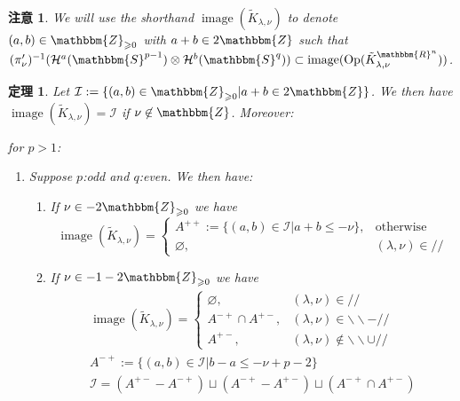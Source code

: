 \documentclass[12pt]{msjproc} %
\newcommand{\assign}{:=}
\newcommand{\nin}{\not\in}
\newcommand{\tmop}[1]{\ensuremath{\operatorname{#1}}}
\newtheorem{theorem}{定理}
\newtheorem{remark}{注意}
\begin{document}
\begin{versiona}
\begin{remark}
  We will use the shorthand $\tmop{image} (\tilde{K}_{\lambda, \nu})$ to
  denote $(a, b) \in \mathbbm{Z}_{\geqslant 0}$ with $a + b \in 2\mathbbm{Z}$
  such that $(\pi_{\nu}')^{- 1} (\mathcal{H}^a (\mathbbm{S}^{p - 1}) \otimes
  \mathcal{H}^b (\mathbbm{S}^q)) \subset \tmop{image} (\tmop{Op}
  (\tilde{K}_{\lambda, \nu}^{\mathbbm{R}^n}))$.
\end{remark}

\begin{theorem}
  \label{images:prop-main}Let $\mathcal{I} \assign \{ (a, b) \in
  \mathbbm{Z}_{\geqslant 0} | a + b \in 2\mathbbm{Z} \}$. We then have
  $\tmop{image} (\tilde{K}_{\lambda, \nu}) =\mathcal{I}$ if $\nu \nin
  \mathbbm{Z}$. Moreover:
  
  for $p > 1$:
\newcommand{\noplus}{}
  \begin{enumerate}
    \item Suppose $p$:odd and $q$:even. We then have:
    \begin{enumerate}
      \item If $\nu \in - 2\mathbbm{Z}_{\geqslant 0}$ we have
      \[ \tmop{image} (\tilde{K}_{\lambda, \nu}) = \left\{ \begin{array}{ll}
           A^{+ +} \assign \{ (a, b) \in \mathcal{I} | a + b \leqslant - \nu
           \}, & \tmop{otherwise}\\
           \varnothing, & (\lambda, \nu) \in / /
         \end{array} \right. \]
      \item If $\nu \in - 1 - 2\mathbbm{Z}_{\geqslant 0}$ we have
      \begin{eqnarray}
        & \tmop{image} (\tilde{K}_{\lambda, \nu}) = \left\{ \begin{array}{ll}
          \varnothing, & (\lambda, \nu) \in / /\\
          A^{- +} \cap A^{\noplus + -}, & (\lambda, \nu) \in
          \backslash\backslash - / /\\
          A^{+ -}, & (\lambda, \nu) \nin \backslash\backslash \cup / /
        \end{array} \right. &  \nonumber\\
        & A^{- +} \assign \{ (a, b) \in \mathcal{I} | b - a \leqslant - \nu +
        p - 2 \} &  \nonumber\\
        & \mathcal{I}= (A^{\noplus \noplus + -} - A^{- +}) \sqcup (A^{- +} -
        A^{+ -}) \sqcup (A^{- +} \cap A^{\noplus + -}) &  \nonumber\\

\end{eqnarray}
\end{enumerate}
\end{enumerate}
\end{theorem}
\end{versiona}
\end{document}
